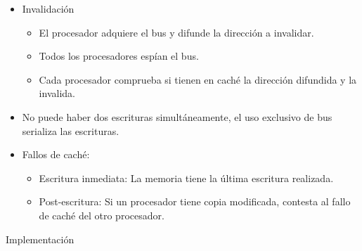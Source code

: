 \documentclass[12pt, twoside, openright]{report} %
\begin{document}
\begin{itemize}

	\item Invalidación

	      \begin{itemize}

		      \item El procesador adquiere el bus y difunde la dirección a
		            invalidar.
		      \item Todos los procesadores espían el bus.
		      \item Cada procesador comprueba si tienen en caché la dirección
		            difundida y la invalida.
	      \end{itemize}
	\item No puede haber dos escrituras simultáneamente, el uso exclusivo
	      de bus serializa las escrituras.
	\item Fallos de caché:

	      \begin{itemize}

		      \item Escritura inmediata: La memoria tiene la última escritura
		            realizada.
		      \item Post-escritura: Si un procesador tiene copia modificada,
		            contesta al fallo de caché del otro procesador.
	      \end{itemize}
\end{itemize}

Implementación
\end{document}
